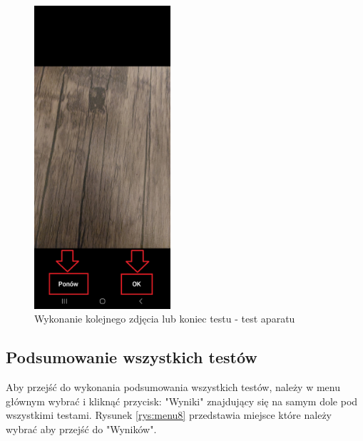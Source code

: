\begin{figure}[!hbt]
	\begin{center}
		\includegraphics[angle=360, width=0.45\textwidth]{rys/punkt6/aparat2}
		\caption{Wykonanie kolejnego zdjęcia lub koniec testu - test aparatu}
		\label{rys:aparat2}
	\end{center}
\end{figure}

\newpage


\subsection{Podsumowanie wszystkich testów}

\hspace{0.60cm}Aby przejść do wykonania podsumowania wszystkich testów, należy w menu głównym wybrać i kliknąć przycisk: "Wyniki" znajdujący się na samym dole pod wszystkimi testami. Rysunek \ref{rys:menu8} przedstawia miejsce które należy wybrać aby przejść do "Wyników".


